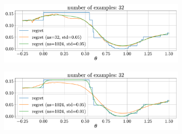 \begin{description}
\begin{description}
                \begin{figure}[H]
                    \centering
                    \begin{subfigure}{0.7\linewidth}
                        \centering
                        \includegraphics[width=\linewidth]{./img/_dfl_stochastic_smoothing1.pdf}
                    \end{subfigure}
                    \centering
                    \begin{subfigure}{0.7\linewidth}
                        \centering
                        \includegraphics[width=\linewidth]{./img/_dfl_stochastic_smoothing2.pdf}
                    \end{subfigure}
                \end{figure}
        \end{description}
\end{description}